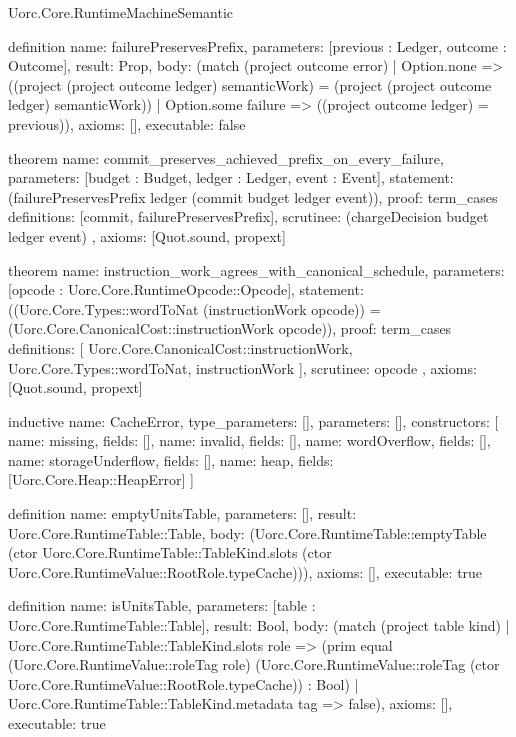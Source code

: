 \begin{lexlean}{Uorc.Core.RuntimeMachineSemantic}
\begin{semanticmodule}
definition{
  name: failurePreservesPrefix,
  parameters: [previous : Ledger, outcome : Outcome],
  result: Prop,
  body: (match (project outcome error)
    | Option.none => ((project (project outcome ledger) semanticWork) = (project (project outcome ledger) semanticWork))
    | Option.some failure => ((project outcome ledger) = previous)),
  axioms: [],
  executable: false
}

theorem{
  name: commit_preserves_achieved_prefix_on_every_failure,
  parameters: [budget : Budget, ledger : Ledger, event : Event],
  statement: (failurePreservesPrefix ledger (commit budget ledger event)),
  proof: term_cases{
    definitions: [commit, failurePreservesPrefix],
    scrutinee: (chargeDecision budget ledger event)
  },
  axioms: [Quot.sound, propext]
}

theorem{
  name: instruction_work_agrees_with_canonical_schedule,
  parameters: [opcode : Uorc.Core.RuntimeOpcode::Opcode],
  statement: ((Uorc.Core.Types::wordToNat (instructionWork opcode)) = (Uorc.Core.CanonicalCost::instructionWork opcode)),
  proof: term_cases{
    definitions: [
      Uorc.Core.CanonicalCost::instructionWork,
      Uorc.Core.Types::wordToNat,
      instructionWork
    ],
    scrutinee: opcode
  },
  axioms: [Quot.sound, propext]
}

inductive{
  name: CacheError,
  type_parameters: [],
  parameters: [],
  constructors: [
    {name: missing, fields: []},
    {name: invalid, fields: []},
    {name: wordOverflow, fields: []},
    {name: storageUnderflow, fields: []},
    {name: heap, fields: [Uorc.Core.Heap::HeapError]}
  ]
}

definition{
  name: emptyUnitsTable,
  parameters: [],
  result: Uorc.Core.RuntimeTable::Table,
  body: (Uorc.Core.RuntimeTable::emptyTable (ctor Uorc.Core.RuntimeTable::TableKind.slots (ctor Uorc.Core.RuntimeValue::RootRole.typeCache))),
  axioms: [],
  executable: true
}

definition{
  name: isUnitsTable,
  parameters: [table : Uorc.Core.RuntimeTable::Table],
  result: Bool,
  body: (match (project table kind)
    | Uorc.Core.RuntimeTable::TableKind.slots role => (prim equal (Uorc.Core.RuntimeValue::roleTag role) (Uorc.Core.RuntimeValue::roleTag (ctor Uorc.Core.RuntimeValue::RootRole.typeCache)) : Bool)
    | Uorc.Core.RuntimeTable::TableKind.metadata tag => false),
  axioms: [],
  executable: true
}


\end{semanticmodule}
\end{lexlean}
